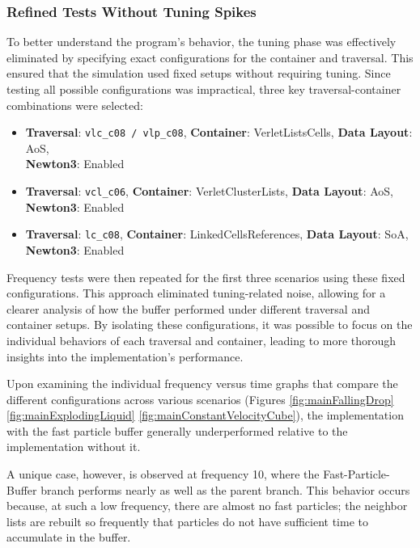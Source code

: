 \subsubsection{Refined Tests Without Tuning Spikes}

To better understand the program's behavior, the tuning phase was effectively eliminated by specifying exact configurations for the container and traversal. This ensured that the simulation used fixed setups without requiring tuning. Since testing all possible configurations was impractical, three key traversal-container combinations were selected:


\begin{itemize}
    \item \textbf{Traversal}: \texttt{vlc\_c08 / vlp\_c08}, \textbf{Container}: VerletListsCells, \textbf{Data Layout}: AoS, \\ \textbf{Newton3}: Enabled
    \item \textbf{Traversal}: \texttt{vcl\_c06}, \textbf{Container}: VerletClusterLists, \textbf{Data Layout}: AoS, \\ \textbf{Newton3}: Enabled
    \item \textbf{Traversal}: \texttt{lc\_c08}, \textbf{Container}: LinkedCellsReferences, \textbf{Data Layout}: SoA, \\ \textbf{Newton3}: Enabled
\end{itemize}



Frequency tests were then repeated for the first three scenarios using these fixed configurations. This approach eliminated tuning-related noise, allowing for a clearer analysis of how the buffer performed under different traversal and container setups. By isolating these configurations, it was possible to focus on the individual behaviors of each traversal and container, leading to more thorough insights into the implementation's performance.

Upon examining the individual frequency versus time graphs that compare the different configurations across various scenarios (Figures \ref{fig:mainFallingDrop} \ref{fig:mainExplodingLiquid} \ref{fig:mainConstantVelocityCube}), the implementation with the fast particle buffer generally underperformed relative to the implementation without it.

A unique case, however, is observed at frequency 10, where the Fast-Particle-Buffer branch performs nearly as well as the parent branch. This behavior occurs because, at such a low frequency, there are almost no fast particles; the neighbor lists are rebuilt so frequently that particles do not have sufficient time to accumulate in the buffer. 


